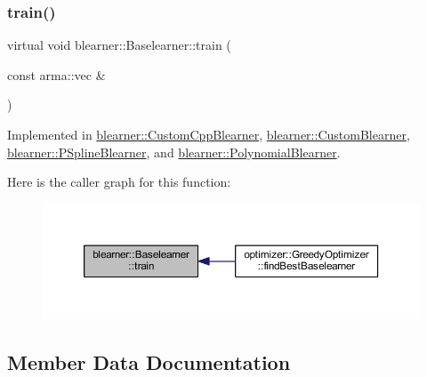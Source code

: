 \subsubsection{\texorpdfstring{train()}{train()}}
{\footnotesize\ttfamily virtual void blearner\+::\+Baselearner\+::train (\begin{DoxyParamCaption}\item[{const arma\+::vec \&}]{ }\end{DoxyParamCaption})\hspace{0.3cm}{\ttfamily [pure virtual]}}



Implemented in \mbox{\hyperlink{classblearner_1_1_custom_cpp_blearner_aa71b777d7092a3d9b47a9bed125eb0f9}{blearner\+::\+Custom\+Cpp\+Blearner}}, \mbox{\hyperlink{classblearner_1_1_custom_blearner_a4726c5b861b67817f7b3eb61d8f6c0d7}{blearner\+::\+Custom\+Blearner}}, \mbox{\hyperlink{classblearner_1_1_p_spline_blearner_aa5c18ceb8396ffce556588486d574be8}{blearner\+::\+P\+Spline\+Blearner}}, and \mbox{\hyperlink{classblearner_1_1_polynomial_blearner_acf24025a73293a2569450dd4659e0997}{blearner\+::\+Polynomial\+Blearner}}.

Here is the caller graph for this function\+:\nopagebreak
\begin{figure}[H]
\begin{center}
\leavevmode
\includegraphics[width=350pt]{classblearner_1_1_baselearner_a40e03ad070b9a03aae706d9ee8094b80_icgraph}
\end{center}
\end{figure}


\subsection{Member Data Documentation}
\mbox{\label{classblearner_1_1_baselearner_a7112e057b2b29bb6529df6df3b8a9165}} 
